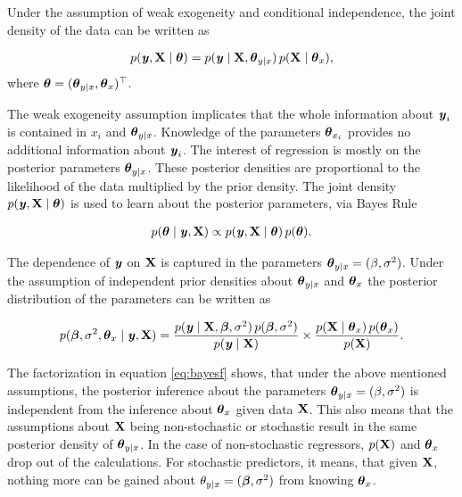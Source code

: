 \documentclass[11pt,a4paper,twoside]{book}
\begin{document}
Under the assumption of weak exogeneity and conditional independence, the joint density of the data can be written as

       \begin{align*} 
p({\textbf{\textit{y}}}, {\mathbf{X}} \mid {\boldsymbol{\theta}}{}) = p({\textbf{\textit{y}}} \mid {\mathbf{X}}, {\boldsymbol{\theta}}{}_{y \mid x}) \, p({\mathbf{X}} \mid {\boldsymbol{\theta}}{}_{x}),
   \end{align*}
where ${\boldsymbol{\theta}}{} = ({\boldsymbol{\theta}}{}_{y \mid x}, {\boldsymbol{\theta}}{}_{x})^\top$. 

The weak exogeneity assumption implicates that the whole information about ${\textbf{\textit{y}}}_{i}$ is contained in $x_{i}$ and ${\boldsymbol{\theta}}{}_{y \mid x}$. Knowledge of the parameters ${\boldsymbol{\theta}}{}_{x_{i}}$ provides no additional information about ${\textbf{\textit{y}}}_{i}$.
The interest of regression is mostly on the posterior parameters ${\boldsymbol{\theta}}{}_{y \mid x}$. These posterior densities are proportional to the likelihood of the data  multiplied by the prior density. The joint density $p({\textbf{\textit{y}}}, {\mathbf{X}} \mid  {\boldsymbol{\theta}}{})$ is used to learn about the posterior parameters, via Bayes Rule

       \begin{align*} 
p({\boldsymbol{\theta}}{} \mid {\textbf{\textit{y}}}, {\mathbf{X}}) \propto p({\textbf{\textit{y}}}, {\mathbf{X}} \mid  {\boldsymbol{\theta}}{}) \, p({\boldsymbol{\theta}}{}).
   \end{align*}
   
   The dependence of ${\textbf{\textit{y}}}$ on ${\mathbf{X}}$ is captured in the parameters ${\boldsymbol{\theta}}{}_{y \mid x} = (\beta, \sigma^2)$. Under the assumption of independent prior densities about ${\boldsymbol{\theta}}{}_{y \mid x}$ and ${\boldsymbol{\theta}}{}_{x}$ the posterior distribution of the parameters can be written as
   
          \begin{align} 
p({\boldsymbol{\beta}}, \sigma^2, {\boldsymbol{\theta}}{}_{x} \mid {\textbf{\textit{y}}}, {\mathbf{X}}) = \frac{p({\textbf{\textit{y}}} \mid {\mathbf{X}}, {\boldsymbol{\beta}}, \sigma^2) \, p({\boldsymbol{\beta}}, \sigma^2)}{p({\textbf{\textit{y}}} \mid {\mathbf{X}})} \times \frac{p({\mathbf{X}} \mid {\boldsymbol{\theta}}{}_{x}) \, p({\boldsymbol{\theta}}{}_{x})}{p({\mathbf{X}})}.  \label{eq:bayesf} 
   \end{align}
   
  The factorization in equation \ref{eq:bayesf} shows, that under the above mentioned assumptions, the posterior inference about the parameters ${\boldsymbol{\theta}}{}_{y \mid x} = (\beta, \sigma^2)$ is independent from the inference about ${\boldsymbol{\theta}}{}_{x}$ given data ${\mathbf{X}}$. This also means that the assumptions about ${\mathbf{X}}$ being non-stochastic or stochastic result in the same posterior density of  ${\boldsymbol{\theta}}{}_{y \mid x}$. In the case of non-stochastic regressors, $p({\mathbf{X}})$ and ${\boldsymbol{\theta}}{}_{x}$ drop out of the calculations. For stochastic predictors, it means, that given ${\mathbf{X}}$, nothing more can be gained about $\theta_{y \mid x} = ({\boldsymbol{\beta}}, \sigma^2)$ from knowing ${\boldsymbol{\theta}}{}_{x}$. 
  
\end{document}

